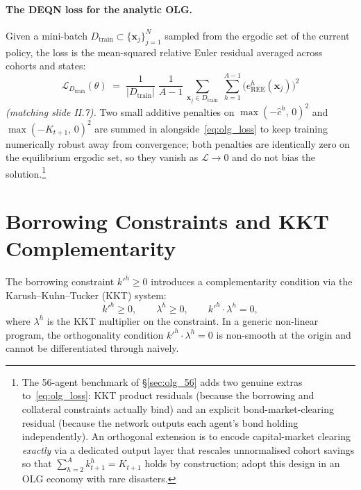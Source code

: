 \documentclass[11pt,a4paper]{report}
\newcommand{\x}{\bm{x}}
\begin{document}
\paragraph{The DEQN loss for the analytic OLG.}
Given a mini-batch $D_{\mathrm{train}}\subset\{\x_j\}_{j=1}^{N}$ sampled from the ergodic set of the current policy, the loss is the mean-squared relative Euler residual averaged across cohorts and states:
\begin{equation}
\boxed{\;\mathcal{L}_{D_{\mathrm{train}}}(\theta)
\;=\;
\frac{1}{|D_{\mathrm{train}}|}\;\frac{1}{A-1}\,
\sum_{\x_j\in D_{\mathrm{train}}}\;\sum_{h=1}^{A-1}
\bigl(e_{\mathrm{REE}}^h(\x_j)\bigr)^2\;}
\label{eq:olg_loss}
\end{equation}
\emph{(matching slide II.7).}  Two small additive penalties on $\max(-\hat c^h,\,0)^2$ and $\max(-K_{t+1},\,0)^2$ are summed in alongside~\eqref{eq:olg_loss} to keep training numerically robust away from convergence; both penalties are identically zero on the equilibrium ergodic set, so they vanish as $\mathcal{L}\to 0$ and do not bias the solution.\footnote{The 56-agent benchmark of \S\ref{sec:olg_56} adds two genuine extras to~\eqref{eq:olg_loss}: KKT product residuals (because the borrowing and collateral constraints actually bind) and an explicit bond-market-clearing residual (because the network outputs each agent's bond holding independently).  An orthogonal extension is to encode capital-market clearing \emph{exactly} via a dedicated output layer that rescales unnormalised cohort savings so that $\sum_{h=2}^{A} k_{t+1}^{h} = K_{t+1}$ holds by construction; \citet{azinoviczemlicka_2024} adopt this design in an OLG economy with rare disasters.}

\section{Borrowing Constraints and KKT Complementarity}
\label{sec:olg_fb}

The borrowing constraint $k'^h \geq 0$ introduces a complementarity condition via the Karush--Kuhn--Tucker (KKT) system:
\begin{equation}
k'^h \geq 0, \qquad \lambda^h \geq 0, \qquad k'^h \cdot \lambda^h = 0,
\label{eq:olg_kkt}
\end{equation}
where $\lambda^h$ is the KKT multiplier on the constraint.  In a generic non-linear program, the orthogonality condition $k'^h \cdot \lambda^h = 0$ is non-smooth at the origin and cannot be differentiated through naively.
\end{document}
